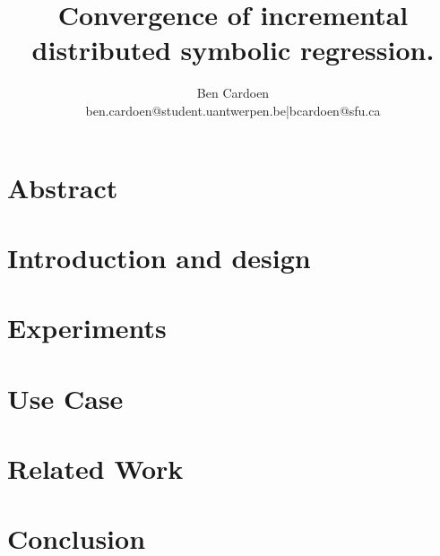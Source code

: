 \documentclass[twocolumn]{article}
\title{Convergence of incremental distributed symbolic regression.
    }
\author{
    Ben Cardoen  \\
    {ben.cardoen@student.uantwerpen.be|bcardoen@sfu.ca}
}
\date{}
\begin{document}
    
    \maketitle
    \section{Abstract}
    
    \section{Introduction and design}
    
    \section{Experiments}
    
    \section{Use Case}
    
    \section{Related Work}
    
    \section{Conclusion}
    
%    
    
    
    
\end{document}
